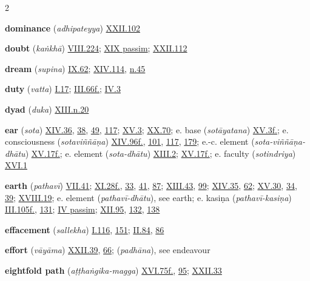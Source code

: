 \begin{multicols}{2}
\begin{vismHanging}
\par\textbf{dominance} (\emph{adhipateyya}) \hyperlink{XXII.102}{XXII.102}{}
\par\textbf{doubt} (\emph{kaṅkhā}) \hyperlink{VIII.224}{VIII.224}{}; \hyperlink{XIX}{XIX passim}{}; \hyperlink{XXII.112}{XXII.112}{}
\par\textbf{dream} (\emph{supina}) \hyperlink{IX.62}{IX.62}{}; \hyperlink{XIV.114}{XIV.114}{}, \hyperlink{XIV.n45}{n.45}{}
\par\textbf{duty} (\emph{vatta}) \hyperlink{I.17}{I.17}{}; \hyperlink{III.66}{III.66f.}{}; \hyperlink{IV.3}{IV.3}{}
\par\textbf{dyad} (\emph{duka}) \hyperlink{XIII.n20}{XIII.n.20}{}
\par\textbf{ear} (\emph{sota}) \hyperlink{XIV.36}{XIV.36}{}, \hyperlink{XIV.38}{38}{}, \hyperlink{XIV.49}{49}{}, \hyperlink{XIV.117}{117}{}; \hyperlink{XV.3}{XV.3}{}; \hyperlink{XX.70}{XX.70}{}; e. base (\emph{sotāyatana}) \hyperlink{XV.3}{XV.3f.}{}; e. consciousness (\emph{sotaviññāṇa}) \hyperlink{XIV.96}{XIV.96f.}{}, \hyperlink{XIV.101}{101}{}, \hyperlink{XIV.117}{117}{}, \hyperlink{XIV.179}{179}{}; e.-c. element (\emph{sota-viññāṇa-dhātu}) \hyperlink{XV.17}{XV.17f.}{}; e. element (\emph{sota-dhātu}) \hyperlink{XIII.2}{XIII.2}{}; \hyperlink{XV.17}{XV.17f.}{}; e. faculty (\emph{sotindriya}) \hyperlink{XVI.1}{XVI.1}{}
\par\textbf{earth} (\emph{pathavī}) \hyperlink{VII.41}{VII.41}{}; \hyperlink{XI.28}{XI.28f.}{}, \hyperlink{XI.33}{33}{}, \hyperlink{XI.41}{41}{}, \hyperlink{XI.87}{87}{}; \hyperlink{XIII.43}{XIII.43}{}, \hyperlink{XIII.99}{99}{}; \hyperlink{XIV.35}{XIV.35}{}, \hyperlink{XIV.62}{62}{}; \hyperlink{XV.30}{XV.30}{}, \hyperlink{XV.34}{34}{}, \hyperlink{XV.39}{39}{}; \hyperlink{XVIII.19}{XVIII.19}{}; e. element (\emph{pathavī-dhātu}), see earth; e. kasiṇa (\emph{pathavī-kasiṇa}) \hyperlink{III.105}{III.105f.}{}, \hyperlink{III.131}{131}{}; \hyperlink{IV}{IV passim}{}; \hyperlink{XII.95}{XII.95}{}, \hyperlink{XII.132}{132}{}, \hyperlink{XII.138}{138}{}
\par\textbf{effacement} (\emph{sallekha}) \hyperlink{I.116}{I.116}{}, \hyperlink{I.151}{151}{}; \hyperlink{II.84}{II.84}{}, \hyperlink{II.86}{86}{}
\par\textbf{effort} (\emph{vāyāma}) \hyperlink{XXII.39}{XXII.39}{}, \hyperlink{XXII.66}{66}{}; (\emph{padhāna}), see endeavour 
\par\textbf{eightfold path} (\emph{aṭṭhaṅgika-magga}) \hyperlink{XVI.75}{XVI.75f.}{}, \hyperlink{XVI.95}{95}{}; \hyperlink{XXII.33}{XXII.33}{}

\end{vismHanging}
\end{multicols}
